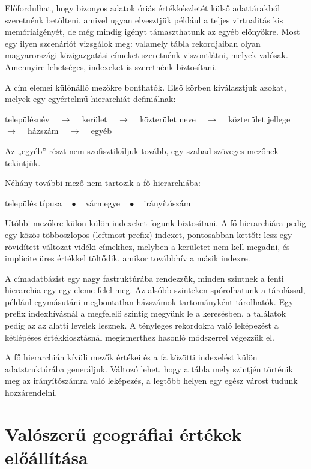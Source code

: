 \documentclass[
    parspace,
    noindent,
    nohyp,
]{elteiktdk}[2023/04/10]
\begin{document}
Előfordulhat, hogy bizonyos adatok óriás értékkészletét külső adattárakból szeretnénk betölteni,
amivel ugyan elvesztjük például a teljes virtualitás kis memóriaigényét,
de még mindig igényt támaszthatunk az egyéb előnyökre.
Most egy ilyen szcenáriót vizsgálok meg:
valamely tábla rekordjaiban olyan magyarországi közigazgatási címeket szeretnénk viszontlátni,
melyek valósak.
Amennyire lehetséges, indexeket is szeretnénk biztosítani.

A cím elemei különálló mezőkre bonthatók.
Első körben kiválasztjuk azokat, melyek egy egyértelmű hierarchiát definiálnak:

\begin{center}
    településnév ~ $\rightarrow$ ~
    kerület ~ $\rightarrow$ ~
    közterület neve ~ $\rightarrow$ ~
    közterület jellege ~ $\rightarrow$ ~
    házszám ~ $\rightarrow$ ~
    egyéb
\end{center}

Az „egyéb” részt nem szofisztikáljuk tovább, egy szabad szöveges mezőnek tekintjük.

Néhány további mező nem tartozik a fő hierarchiába:

\begin{center}
    település típusa ~ $\bullet$ ~
    vármegye ~ $\bullet$ ~
    irányítószám
\end{center}

Utóbbi mezőkre külön-külön indexeket fogunk biztosítani.
A fő hierarchiára pedig egy közös többoszlopos (leftmost prefix) indexet,
pontosabban kettőt:
lesz egy rövidített változat vidéki címekhez, melyben a kerületet nem kell megadni,
és implicite üres értékkel töltődik, amikor továbbhív a másik indexre.

A címadatbázist egy nagy fastruktúrába rendezzük,
minden szintnek a fenti hierarchia egy-egy eleme felel meg.
Az alsóbb szinteken spórolhatunk a tárolással,
például egymásutáni megbontatlan házszámok tartományként tárolhatók.
Egy prefix indexhívásnál a megfelelő szintig megyünk le a keresésben,
a találatok pedig az az alatti levelek lesznek.
A tényleges rekordokra való leképezést
a kétlépéses értékkiosztásnál megismerthez hasonló módszerrel végezzük el.

A fő hierarchián kívüli mezők értékei és a fa közötti indexelést külön adatstruktúrába generáljuk.
Változó lehet, hogy a tábla mely szintjén történik meg az irányítószámra való leképezés,
a legtöbb helyen egy egész várost tudunk hozzárendelni.

\section{Valószerű geográfiai értékek előállítása}
\end{document}
